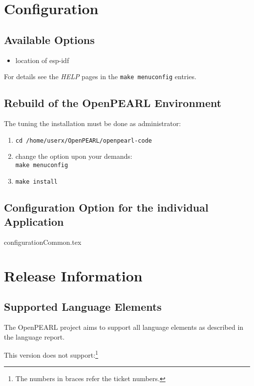 \documentclass[oneside,10pt]{scrbook}
\begin{document}
\chapter{Configuration}
\section{Available Options}
\begin{itemize}
\item location of esp-idf
\end{itemize}

For details see the {\em HELP} pages in the \verb|make menuconfig| 
entries.

\section{Rebuild of the OpenPEARL Environment}
The tuning the installation must be done as administrator:
\begin{enumerate}
\item \verb|cd /home/userx/OpenPEARL/openpearl-code|
\item change the option upon your demands:\\
      \verb|make menuconfig| 
\item \verb|make install|
\end{enumerate}

\section{Configuration Option for the individual Application}
{configurationCommon.tex}

\chapter{Release Information}
\section{Supported Language Elements}
The OpenPEARL project aims to support all language elements  as
described in the language report.

This version does not support:\footnote{The numbers in braces refer the ticket numbers.}
\end{document}
